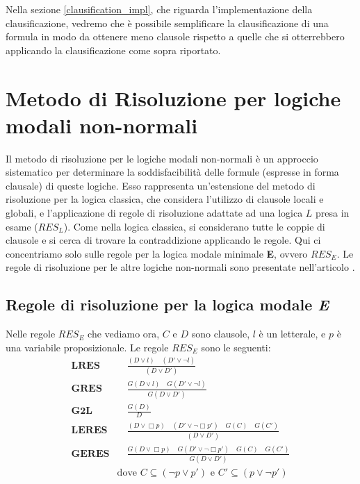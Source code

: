 \documentclass[a4paper,12pt]{report}
\begin{document}
Nella sezione \ref{clausification_impl}, che riguarda l'implementazione della clausificazione, vedremo che è possibile semplificare la clausificazione di una formula in modo da ottenere meno clausole rispetto a quelle che si otterrebbero applicando la clausificazione come sopra riportato.

\section{Metodo di Risoluzione per logiche modali non-normali}
Il metodo di risoluzione per le logiche modali non-normali è un approccio sistematico per determinare la soddisfacibilità delle formule (espresse in forma clausale) di queste logiche. Esso rappresenta un'estensione del metodo di risoluzione per la logica classica, che considera l'utilizzo di clausole locali e globali, e l'applicazione di regole di risoluzione adattate ad una logica $L$ presa in esame ($RES_L$). Come nella logica classica, si considerano tutte le coppie di clausole e si cerca di trovare la contraddizione applicando le regole. Qui ci concentriamo solo sulle regole per la logica modale minimale \textbf{E}, ovvero $RES_E$. Le regole di risoluzione per le altre logiche non-normali sono presentate nell'articolo \cite{Articolo_resolution}.

\subsection{Regole di risoluzione per la logica modale \emph{E}}
Nelle regole $RES_E$ che vediamo ora, $C$ e $D$ sono clausole, $l$ è un letterale, e $p$ è una variabile proposizionale. Le regole $RES_E$ sono le seguenti:
\begin{align*}
    \textbf{LRES} & \quad \frac{(D \lor l) \quad (D' \lor \lnot l)}{(D \lor D')} \\[10pt]
    \textbf{GRES} & \quad \frac{G(D \lor l) \quad G(D' \lor \lnot l)}{G(D \lor D')} \\[10pt]
    \textbf{G2L} & \quad \frac{G(D)}{D} \\[10pt]
    \textbf{LERES} & \quad \frac{(D \lor \Box p) \quad (D' \lor \lnot \Box p') \quad G(C) \quad G(C')}{(D \lor D')} \\[10pt]
    \textbf{GERES} & \quad \frac{G(D \lor \Box p) \quad G(D' \lor \lnot \Box p') \quad G(C) \quad G(C')}{G(D \lor D')} \\[10pt]
    & \text{dove } C \subseteq (\lnot p \lor p') \text{ e } C' \subseteq (p \lor \lnot p')
\end{align*}
\end{document}
